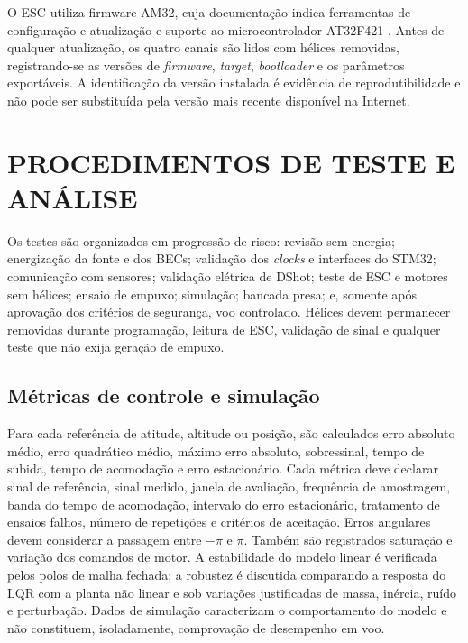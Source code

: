 O ESC utiliza firmware AM32, cuja documentação indica ferramentas de configuração e atualização e suporte ao microcontrolador AT32F421 \cite{am32manual}. Antes de qualquer atualização, os quatro canais são lidos com hélices removidas, registrando-se as versões de \textit{firmware}, \textit{target}, \textit{bootloader} e os parâmetros exportáveis. A identificação da versão instalada é evidência de reprodutibilidade e não pode ser substituída pela versão mais recente disponível na Internet.





\section{PROCEDIMENTOS DE TESTE E ANÁLISE}\label{sec:procedimentos_teste}

Os testes são organizados em progressão de risco: revisão sem energia; energização da fonte e dos BECs; validação dos \textit{clocks} e interfaces do STM32; comunicação com sensores; validação elétrica de DShot; teste de ESC e motores sem hélices; ensaio de empuxo; simulação; bancada presa; e, somente após aprovação dos critérios de segurança, voo controlado. Hélices devem permanecer removidas durante programação, leitura de ESC, validação de sinal e qualquer teste que não exija geração de empuxo.

\subsection{Métricas de controle e simulação}\label{subsec:metricas_lqr}

Para cada referência de atitude, altitude ou posição, são calculados erro absoluto médio, erro quadrático médio, máximo erro absoluto, sobressinal, tempo de subida, tempo de acomodação e erro estacionário. Cada métrica deve declarar sinal de referência, sinal medido, janela de avaliação, frequência de amostragem, banda do tempo de acomodação, intervalo do erro estacionário, tratamento de ensaios falhos, número de repetições e critérios de aceitação. Erros angulares devem considerar a passagem entre $-\pi$ e $\pi$. Também são registrados saturação e variação dos comandos de motor. A estabilidade do modelo linear é verificada pelos polos de malha fechada; a robustez é discutida comparando a resposta do LQR com a planta não linear e sob variações justificadas de massa, inércia, ruído e perturbação. Dados de simulação caracterizam o comportamento do modelo e não constituem, isoladamente, comprovação de desempenho em voo.

